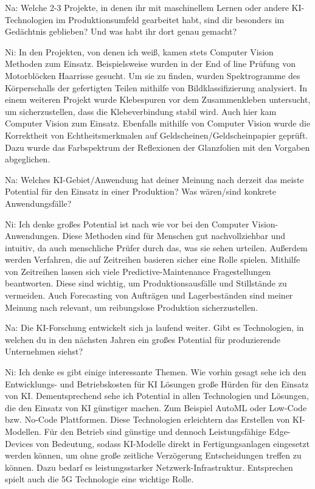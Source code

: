 \documentclass[a4paper,12pt, german]{report}
\begin{document}
Na: Welche 2-3 Projekte, in denen ihr mit maschinellem Lernen oder andere KI-Technologien im Produktionsumfeld gearbeitet habt, sind dir besonders im Gedächtnis geblieben? Und was habt ihr dort genau gemacht?

Ni: In den Projekten, von denen ich weiß, kamen stets Computer Vision Methoden zum Einsatz. Beispielsweise wurden in der End of line Prüfung von Motorblöcken Haarrisse gesucht. Um sie zu finden, wurden Spektrogramme des Körperschalls der gefertigten Teilen mithilfe von Bildklassifizierung analysiert. \newline
In einem weiteren Projekt wurde Klebespuren vor dem Zusammenkleben untersucht, um sicherzustellen, dass die Klebeverbindung stabil wird. Auch hier kam Computer Vision zum Einsatz. \newline
Ebenfalls mithilfe von Computer Vision wurde die Korrektheit von Echtheitsmerkmalen auf Geldscheinen/Geldscheinpapier geprüft. Dazu wurde das Farbspektrum der Reflexionen der Glanzfolien mit den Vorgaben abgeglichen.

Na:	Welches KI-Gebiet/Anwendung hat deiner Meinung nach derzeit das meiste Potential für den Einsatz in einer Produktion? Was wären/sind konkrete Anwendungsfälle?

Ni: Ich denke großes Potential ist nach wie vor bei den Computer Vision-Anwendungen. Diese Methoden sind für Menschen gut nachvollziehbar und intuitiv, da auch menschliche Prüfer durch das, was sie sehen urteilen. Außerdem werden Verfahren, die auf Zeitreihen basieren sicher eine Rolle spielen. Mithilfe von Zeitreihen lassen sich viele Predictive-Maintenance Fragestellungen beantworten. Diese sind wichtig, um Produktionsausfälle und Stillstände zu vermeiden. Auch Forecasting von Aufträgen und Lagerbeständen sind meiner Meinung nach relevant, um reibungslose Produktion sicherzustellen.

Na: Die KI-Forschung entwickelt sich ja laufend weiter. Gibt es Technologien, in welchen du in den nächsten Jahren ein großes Potential für produzierende Unternehmen siehst?

Ni: Ich denke es gibt einige interessante Themen. Wie vorhin gesagt sehe ich den Entwicklungs- und Betriebskosten für KI Lösungen große Hürden für den Einsatz von KI. Dementsprechend sehe ich Potential in allen Technologien und Lösungen, die den Einsatz von KI günstiger machen. Zum Beispiel AutoML oder Low-Code bzw. No-Code Plattformen. Diese Technologien erleichtern das Erstellen von KI-Modellen. Für den Betrieb sind günstige und dennoch Leistungsfähige Edge-Devices von Bedeutung, sodass KI-Modelle direkt in Fertigungsanlagen eingesetzt werden können, um ohne große zeitliche Verzögerung Entscheidungen treffen zu können. Dazu bedarf es leistungsstarker Netzwerk-Infrastruktur. Entsprechen spielt auch die 5G Technologie eine wichtige Rolle.
\end{document}
